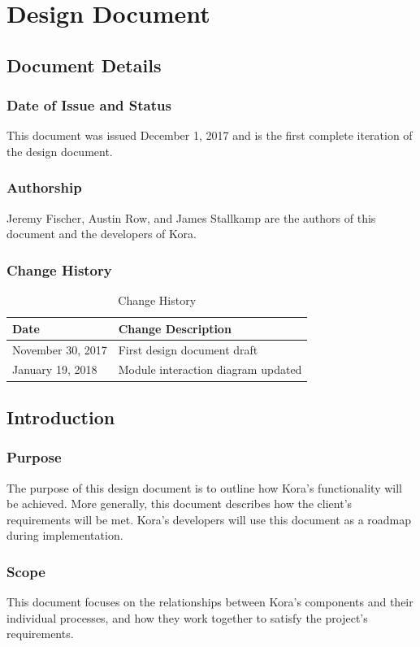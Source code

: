 \documentclass[onecolumn, draftclsnofoot,10pt, compsoc]{IEEEtran}
\def \botname{Kora\xspace}
\begin{document}
\section{Design Document}
	\subsection{Document Details}
	\subsubsection{Date of Issue and Status}
	This document was issued December 1, 2017 and is the first complete iteration of the design document.

	\subsubsection{Authorship}
	Jeremy Fischer, Austin Row, and James Stallkamp are the authors of this document and the developers of \botname.

	\subsubsection{Change History}
	\begin{table}[H]
		\centering
		\caption{Change History}
		\label{my-label}
		\begin{tabular}{|l|l|}
			\hline
			\textbf{Date}     & \textbf{Change Description}   \\ \hline
			November 30, 2017 & {First design document draft} \\ \hline
			January 19, 2018 & {Module interaction diagram updated} \\ \hline
		\end{tabular}
	\end{table}

	\subsection{Introduction}
	\subsubsection{Purpose}
	The purpose of this design document is to outline how \botname's functionality will be achieved.
	More generally, this document describes how the client's requirements will be met.
	\botname's developers will use this document as a roadmap during implementation.

	\subsubsection{Scope}
	This document focuses on the relationships between \botname's components and their individual processes, and how they work together to satisfy the project's requirements.
\end{document}
